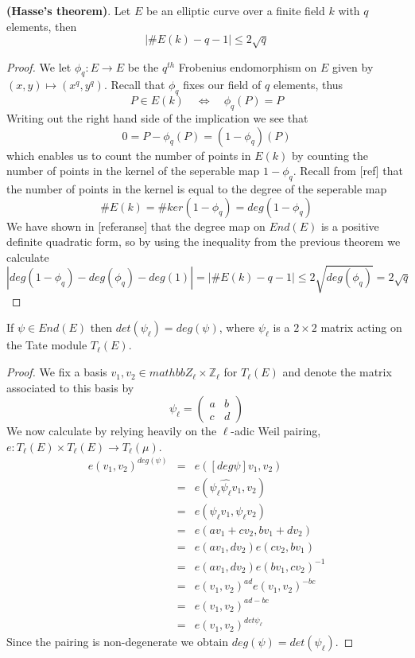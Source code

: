 \begin{thm}
 \textbf{(Hasse's theorem)}. Let $E$ be an elliptic curve over a finite field $k$ with $q$ elements, then
$$ |\#E(k) - q - 1| \leq 2\sqrt{q} $$
\end{thm}
\begin{proof}
 We let $\phi_q: E \rightarrow E$ be the $q^{th}$ Frobenius endomorphism on $E$ given by 
$(x,y) \mapsto (x^q, y^q)$. Recall that $\phi_q$ fixes our field of $q$ elements, thus
$$ P \in E(k) \quad \iff \quad \phi_q(P) = P$$
Writing out the right hand side of the implication we see that
$$ 0 = P - \phi_q(P) = (1 - \phi_q)(P) $$
which enables us to count the number of points in $E(k)$ by counting the number of points in the kernel
of the seperable map $1-\phi_q$. Recall from [ref] that the number of points in the kernel is equal
to the degree of the seperable map
$$ \#E(k) = \# ker(1-\phi_q) = deg(1-\phi_q) $$
We have shown in [referanse] that the degree map on $End(E)$ is a positive definite quadratic form, so
by using the inequality from the previous theorem we calculate
$$|deg(1-\phi_q) - deg(\phi_q) - deg(1)| = |\#E(k) - q - 1| \leq 2\sqrt{deg(\phi_q)} = 2\sqrt{q}$$
\end{proof}

\begin{prop}
 If $\psi \in End(E)$ then $det(\psi_\ell) = deg(\psi)$, where $\psi_\ell$ is a $2\times2$ matrix acting
on the Tate module $T_\ell(E)$.
\end{prop}
\begin{proof}
 We fix a basis $v_1,v_2 \in mathbb{Z}_\ell \times \mathbb{Z}_\ell$ for $T_\ell(E)$ and denote the matrix
associated to this basis by
$$ \psi_\ell = \begin{pmatrix} a & b \\ c & d \end{pmatrix} $$
We now calculate by relying heavily on the $\ell$-adic Weil pairing,
$e: T_\ell(E) \times T_\ell(E) \rightarrow T_\ell(\mu)$.
\begin{eqnarray}
 e(v_1, v_2)^{deg(\psi)} &=& e([deg \psi]v_1, v_2) \nonumber \\
			 &=& e(\psi_\ell \widehat{\psi_\ell} v_1, v_2) \nonumber \\
			 &=& e(\psi_\ell v_1, \psi_\ell v_2) \nonumber \\
			 &=& e(a v_1 + c v_2, b v_1 + d v_2) \nonumber \\
			 &=& e(a v_1, d v_2) e(c v_2, b v_1) \nonumber \\
			 &=& e(a v_1, d v_2) e(b v_1, c v_2)^{-1} \nonumber \\
			 &=& e(v_1, v_2)^{ad} e(v_1, v_2)^{-bc} \nonumber \\
			 &=& e(v_1, v_2)^{ad - bc} \nonumber \\
			 &=& e(v_1, v_2)^{det \psi_\ell} \nonumber
\end{eqnarray}
Since the pairing is non-degenerate we obtain $deg(\psi) = det(\psi_\ell)$.
\end{proof}

